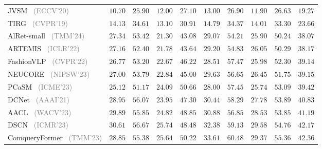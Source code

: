 \begin{table*}
\begin{tabular}{l|cc|cc|cc|cc|c}
    JVSM~\cite{chen2020jvsm} \footnotesize{\textcolor{gray}{(ECCV'20)}} & $10.70 $ & $25.90$ & $12.00$ & $27.10$ & $13.00$ & $26.90$ & $11.90$ & $26.63$ &$19.27$ \\
    TIRG~\cite{vo2019tirg} \footnotesize{\textcolor{gray}{(CVPR'19)}} & $14.13$ & $34.61$ & $13.10$ & $30.91$ & $14.79$ & $34.37$ & $14.01$ & $33.30$ &$23.66$ \\
    AlRet-small~\cite{xu2024alret} \footnotesize{\textcolor{gray}{(TMM'24)}} & $27.34$ & $53.42$ & $21.30$ & $43.08$ & $29.07$ & $54.21$ & $25.90$ & $50.24$ &$38.07$ \\
    ARTEMIS~\cite{delmas2022artemis} \footnotesize{\textcolor{gray}{(ICLR'22)}} & $27.16$ & $52.40$ & $21.78$ & $43.64$ & $29.20$ & $54.83$ & $26.05$ & $50.29$ & $38.17$ \\
    FashionVLP~\cite{goenka2022fashionvlp} \small{\textcolor{gray}{(CVPR'22)}} & $26.77$ & $53.20$ & $22.67$ & $46.22$ & $28.51$ & $57.47$ & $25.98$ & $52.30$ & $39.14 $ \\
    NEUCORE~\cite{zhao2024neucore} \footnotesize{\textcolor{gray}{(NIPSW'23)}}& $27.00$ & $53.79$ & $22.84$ & $45.00$ & $29.63$ & $56.65$ & $26.45$ & $51.75$ & $39.15 $ \\
    PCaSM~\cite{zhang2023pcasm} \footnotesize{\textcolor{gray}{(ICME'23)}} & $25.12$ & $51.17$ & $24.09$ & $50.66$ & $28.00$ & $57.45$ & $25.74$ & $53.09$ &$39.42$ \\
    DCNet~\cite{kim2021dcnet} \footnotesize{\textcolor{gray}{(AAAI'21)}} & $28.95$ & $56.07$ & $23.95$ & $47.30$ & $30.44$ & $58.29$ & $27.78$ & $53.89$ &$40.83$ \\
    AACL~\cite{tian2023aacl} \footnotesize{\textcolor{gray}{(WACV'23)}} & $29.89$ & $55.85$ & $24.82$ & $48.85$ & $30.88$ & $56.85$ & $28.53$ & $53.85$ & $41.19$ \\
    DSCN~\cite{li2023dscn} \footnotesize{\textcolor{gray}{(ICMR'23)}} & $30.61$ & $56.67$ & $25.74$ & $48.48$ & $32.38$ & $59.13$ & $29.58$ & $54.76$ & $42.17$ \\
    ComqueryFormer~\cite{xu2023ComqueryFormer} \small{\textcolor{gray}{(TMM'23)}} & $28.85$ & $55.38$ & $25.64$ & $50.22$ & $33.61$ & $60.48$ & $29.37$ & $55.36$ & $42.36 $ \\
    

\end{tabular}
\end{table*}
